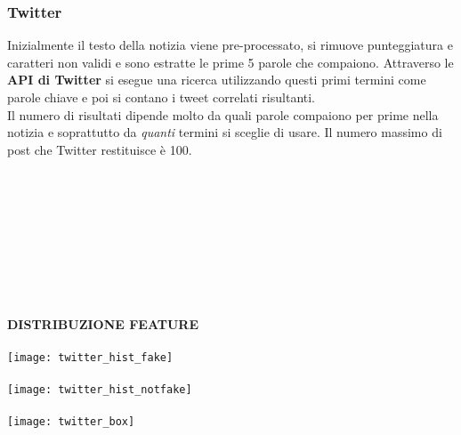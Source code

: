 \documentclass{article}
\begin{document}
\begin{multicols}{2}
				\subsubsection{Twitter}
				Inizialmente il testo della notizia viene pre-processato, si rimuove punteggiatura e caratteri non validi e sono estratte le prime 5 parole che compaiono. Attraverso le \textbf{API di Twitter} si esegue una ricerca utilizzando questi primi termini come parole chiave e poi si contano i tweet correlati risultanti.\\
				Il numero di risultati dipende molto da quali parole compaiono per prime nella notizia e soprattutto da \textit{quanti} termini si sceglie di usare. Il numero massimo di post che Twitter restituisce è 100.
				\\~\\
				\\~\\
				\\~\\
				\\~\\
				\\~\\
				
				\textbf{DISTRIBUZIONE FEATURE}	
				\\~\\
				\texttt{[image: twitter\_hist\_fake]}
				\\~\\
				\texttt{[image: twitter\_hist\_notfake]}
				\\~\\
				\texttt{[image: twitter\_box]}
				\\~\\
				

\end{multicols}
\end{document}
